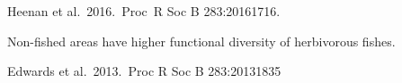 \documentclass[t]{beamer}
\begin{document}
%
%
{
	\begin{frame}[b]
	
	\hfill \tiny Heenan et al.~2016.~Proc~R Soc B 283:20161716. %
	
\end{frame}
}
%
{
\begin{frame}[b]{Non-fished areas have higher functional diversity of herbivorous fishes.}
	
	\hfill \tiny Edwards et al.~2013.~Proc R Soc B 283:20131835
	
\end{frame}
}
%

%
%
%
%	
%
%


%
%
%
%
%
%
%
%
\end{document}
